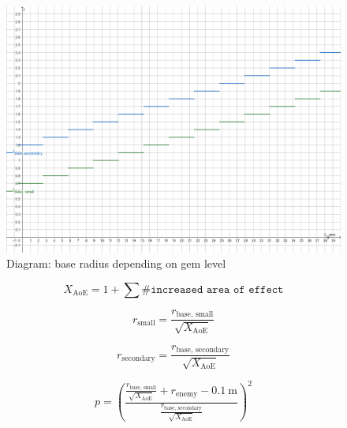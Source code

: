 \begin{figure}
	\centering
	\includegraphics[width=\linewidth]{./02_Illustrations/Diagram_BaseRadToGemLevel.png}
	\caption{Diagram: base radius depending on gem level}
	\label{fig:Diagram_BaseRadToGemLevel}
\end{figure}

\begin{equation}
	X_\text{AoE} = 1 + \sum{\texttt{\# increased area of effect}}
\end{equation}

\begin{equation}
	r_\text{small} = \frac{r_\text{base, small}}{\sqrt{X_\text{AoE}}}
\end{equation}

\begin{equation}
	r_\text{secondary} = \frac{r_\text{base, secondary}}{\sqrt{X_\text{AoE}}}
\end{equation}


\begin{equation}
	p = \left(\frac{\frac{r_\text{base, small}}{\sqrt{X_\text{AoE}}} + r_\text{enemy} - \SI{0.1}{\meter}}{\frac{r_\text{base, secondary}}{\sqrt{X_\text{AoE}}}}\right)^2
\end{equation}

